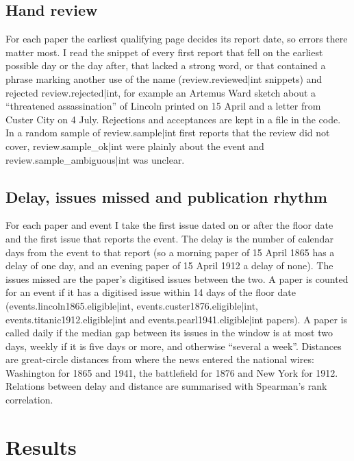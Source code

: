 \documentclass[11pt,a4paper]{article}
\begin{document}
\subsection{Hand review}
For each paper the earliest qualifying page decides its report date, so errors there matter most. I read the snippet of every first report that fell on the earliest possible day or the day after, that lacked a strong word, or that contained a phrase marking another use of the name ({{review.reviewed|int}} snippets) and rejected {{review.rejected|int}}, for example an Artemus Ward sketch about a ``threatened assassination'' of Lincoln printed on 15 April and a letter from Custer City on 4 July. Rejections and acceptances are kept in a file in the code. In a random sample of {{review.sample|int}} first reports that the review did not cover, {{review.sample_ok|int}} were plainly about the event and {{review.sample_ambiguous|int}} was unclear.

\subsection{Delay, issues missed and publication rhythm}
For each paper and event I take the first issue dated on or after the floor date and the first issue that reports the event. The delay is the number of calendar days from the event to that report (so a morning paper of 15 April 1865 has a delay of one day, and an evening paper of 15 April 1912 a delay of none). The issues missed are the paper's digitised issues between the two. A paper is counted for an event if it has a digitised issue within 14 days of the floor date ({{events.lincoln1865.eligible|int}}, {{events.custer1876.eligible|int}}, {{events.titanic1912.eligible|int}} and {{events.pearl1941.eligible|int}} papers). A paper is called daily if the median gap between its issues in the window is at most two days, weekly if it is five days or more, and otherwise ``several a week''. Distances are great-circle distances from where the news entered the national wires: Washington for 1865 and 1941, the battlefield for 1876 and New York for 1912. Relations between delay and distance are summarised with Spearman's rank correlation.

\section{Results}
\end{document}
